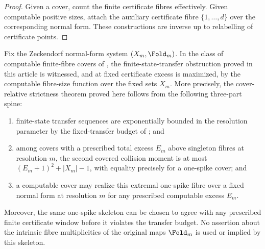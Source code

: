 \begin{proof}
Given a cover, count the finite certificate fibres effectively.  Given
computable positive sizes, attach the auxiliary certificate fibre
\(\{1,\ldots,d\}\) over the corresponding normal form.  These
constructions are inverse up to relabelling of certificate points.
\end{proof}

\begin{theorem}
\label{thm:L2-cover-skeleton-strictness}
Fix the Zeckendorf normal-form system \((X_m,\Fold_m)\).  In the class of
computable finite-fibre covers of , the
finite-state-transfer obstruction proved in this article is witnessed, and at
fixed certificate excess is maximized, by the computable fibre-size function over
the fixed sets \(X_m\).  More precisely, the cover-relative strictness theorem
proved here follows from the following three-part spine:
\begin{enumerate}
\item finite-state transfer sequences are exponentially bounded in the
  resolution parameter by the fixed-transfer budget of
  ; and
\item among covers with a prescribed total excess \(E_m\) above singleton fibres
  at resolution \(m\), the second covered collision moment is at most
  \((E_m+1)^2+|X_m|-1\), with equality precisely for a one-spike cover; and
\item a computable cover may realize this extremal one-spike fibre over a fixed
  normal form at resolution \(m\) for any prescribed computable excess \(E_m\).
\end{enumerate}
Moreover, the same one-spike skeleton can be chosen to agree with any prescribed
finite certificate window before it violates the transfer budget.
No assertion about the intrinsic fibre multiplicities of the original maps
\(\Fold_m\) is used or implied by this skeleton.
\end{theorem}

